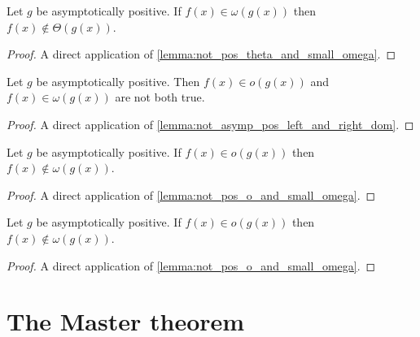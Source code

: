 \begin{lemma}
    \label{lemma:not_pos_theta_of_small_omega}
    \leanok
    Let $g$ be asymptotically positive. If $f(x) \in \omega(g(x))$ then $f(x) \notin \Theta(g(x))$.
\end{lemma}

\begin{proof}
    \leanok
    A direct application of \ref{lemma:not_pos_theta_and_small_omega}.
\end{proof}

\begin{lemma}
    \label{lemma:not_pos_o_and_small_omega}
    \leanok
    Let $g$ be asymptotically positive. Then $f(x) \in o(g(x))$ and 
    $f(x) \in \omega(g(x))$ are not both true.
\end{lemma}

\begin{proof}
    \leanok
    A direct application of \ref{lemma:not_asymp_pos_left_and_right_dom}.
\end{proof}

\begin{lemma}
    \label{lemma:not_pos_small_omega_of_o}
    \leanok
    Let $g$ be asymptotically positive. If $f(x) \in o(g(x))$ then $f(x) \notin \omega(g(x))$.
\end{lemma}

\begin{proof}
    \leanok
    A direct application of \ref{lemma:not_pos_o_and_small_omega}.
\end{proof}

\begin{lemma}
    \label{lemma:not_pos_o_of_small_omega}
    \leanok
    Let $g$ be asymptotically positive. If $f(x) \in o(g(x))$ then $f(x) \notin \omega(g(x))$.
\end{lemma}

\begin{proof}
    \leanok
    A direct application of \ref{lemma:not_pos_o_and_small_omega}.
\end{proof}


\section{The Master theorem}

